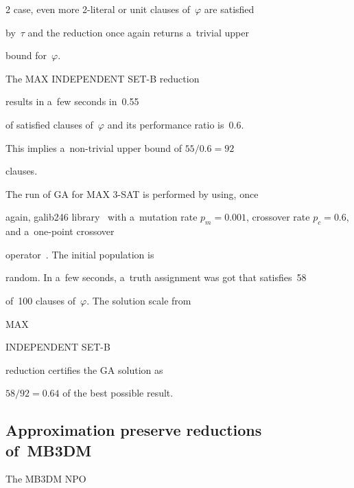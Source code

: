 \begin{multicols}{2}
case, even more 2-literal or unit clauses of~$\varphi$ are satisfied


by~$\tau$ and the reduction once again returns a~trivial upper


bound for~$\varphi$.





The {MAX INDEPENDENT SET-B} reduction~\cite{link-to-the-sofware-cite}


results in a~few seconds in~0.55


of satisfied clauses of~$\varphi$ and its performance ratio is~0.6.


This implies a~non-trivial upper bound of $55/0.6=92$


clauses.





The run of {GA} for {MAX 3-SAT} is performed by using, once


again, galib246 library~\cite{GAlib} with a~mutation rate $p_{m} =


0.001$, crossover rate $p_{c} = 0.6$, and a~one-point crossover


operator~\cite{link-to-the-sofware-cite}. The initial population is


random. In a~few seconds, a~truth assignment was got that satisfies~58


of~100 clauses of~$\varphi$. The solution scale from {MAX


INDEPENDENT SET-B} reduction certifies the {GA} solution as


$58/92=0.64$ of the best possible result.





\vspace*{-6pt}





\subsection{Approximation preserve reductions of~MB3DM}





\vspace*{-2pt}





\noindent


The MB3DM {NPO}



\end{multicols}

